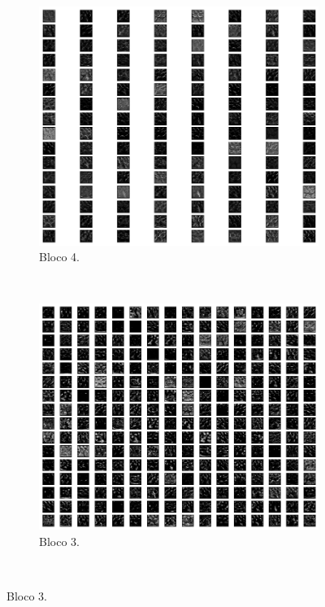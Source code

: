 \begin{figure}[p]
     \begin{subfigure}[t]{0.45\textwidth}
         \centering
         \includegraphics[width=1\linewidth]{recursos/imagens/results/max2.png}
         \caption{Bloco 4.}
         \label{results:fig:datasets:max.2}
     \end{subfigure}%
     ~ 
     \begin{subfigure}[t]{0.45\textwidth}
         \centering
         \includegraphics[width=1\linewidth]{recursos/imagens/results/max3.png}
         \caption{Bloco 3.}
         \label{results:fig:datasets:max.3}
     \end{subfigure}%
     ~ 
 

\end{figure}
